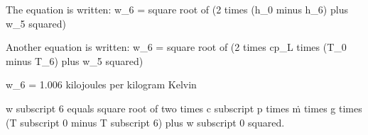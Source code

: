 The equation is written:  
w_6 = square root of (2 times (h_0 minus h_6) plus w_5 squared)  

Another equation is written:  
w_6 = square root of (2 times cp_L times (T_0 minus T_6) plus w_5 squared)  

w_6 = 1.006 kilojoules per kilogram Kelvin

w subscript 6 equals square root of two times c subscript p times ṁ times g times (T subscript 0 minus T subscript 6) plus w subscript 0 squared.